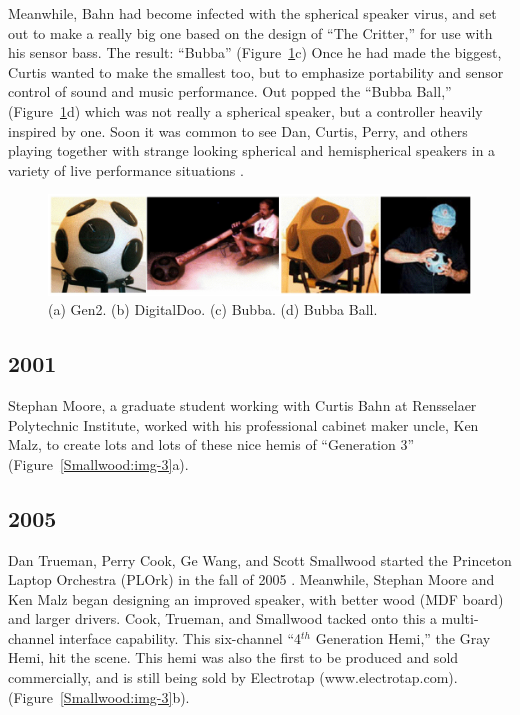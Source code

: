 Meanwhile, Bahn had become infected with the spherical speaker virus, and set
out to make a really big one based on the design of ``The Critter,'' for use with
his sensor bass. The result: ``Bubba'' (Figure~\ref{Smallwood:img-2}c) Once he had made the biggest,
Curtis wanted to make the smallest too, but to emphasize portability and sensor
control of sound and music performance. Out popped the ``Bubba Ball,'' (Figure~\ref{Smallwood:img-2}d)
which was not really a spherical speaker, but a controller heavily inspired by
one.  Soon it was common to see Dan, Curtis, Perry, and others playing together
with strange looking spherical and hemispherical speakers in a variety of live
performance situations \cite{Trueman:2000}.

\begin{figure}[t]
\centering
\includegraphics[width=\textwidth]{img-2-eps-converted-to-crop.pdf}
\caption{(a) Gen2. (b) DigitalDoo.  (c) Bubba.  (d) Bubba Ball.}
\label{Smallwood:img-2}
\end{figure}


\subsection{2001}

Stephan Moore, a graduate student working with Curtis Bahn at Rensselaer
Polytechnic Institute, worked with his professional cabinet maker uncle, Ken
Malz, to create lots and lots of these nice hemis of ``Generation 3'' (Figure~\ref{Smallwood:img-3}a).

\subsection{2005}

Dan Trueman, Perry Cook, Ge Wang, and Scott Smallwood started the Princeton
Laptop Orchestra (PLOrk) in the fall of 2005 \cite{Smallwood:2008,Trueman:2006,Trueman:2007,Wang:2008a}. Meanwhile, Stephan
Moore and Ken Malz began designing an improved speaker, with better wood (MDF
board) and larger drivers. Cook, Trueman, and Smallwood tacked onto this a
multi-channel interface capability. This six-channel ``4$^{th}$ Generation
Hemi,'' the Gray Hemi, hit the scene. This hemi was also the first to be produced
and sold commercially, and is still being sold by Electrotap
(www.electrotap.com). (Figure~\ref{Smallwood:img-3}b).

